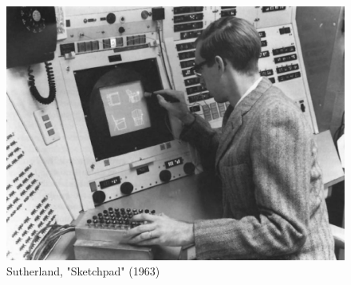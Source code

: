 {{        \begin{figure}[h]
            \begin{center}
                \includegraphics[width=1\textwidth]{chapters/introduction/figures/sketchpad.png}
            \end{center}
            \caption{Sutherland, "Sketchpad" (1963) \cite{sutherland1964sketchpad}}
            \label{fig:sketchpad}
        \end{figure}

}}

